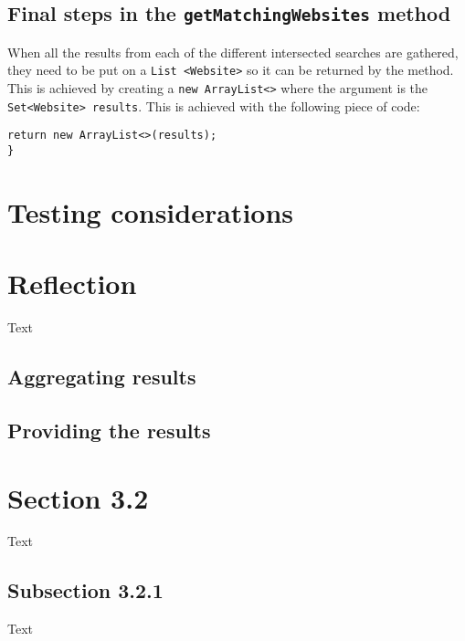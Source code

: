 \subsection{Final steps in the {\tt getMatchingWebsites} method}
When all the results from each of the different intersected searches are gathered, they need to be put on a {\tt List <Website>} so it can be returned by the method. This is achieved by creating a {\tt new ArrayList<>} where the argument is the {\tt Set<Website> results}. This is achieved with the following piece of code:
\begin{lstlisting}
return new ArrayList<>(results);
}
\end{lstlisting}

\section{Testing considerations} %

\section{Reflection} %

Text \\



\subsection{Aggregating results}

\subsection{Providing the results}

\section{Section 3.2}
Text\\




\subsection{Subsection 3.2.1}
Text\\